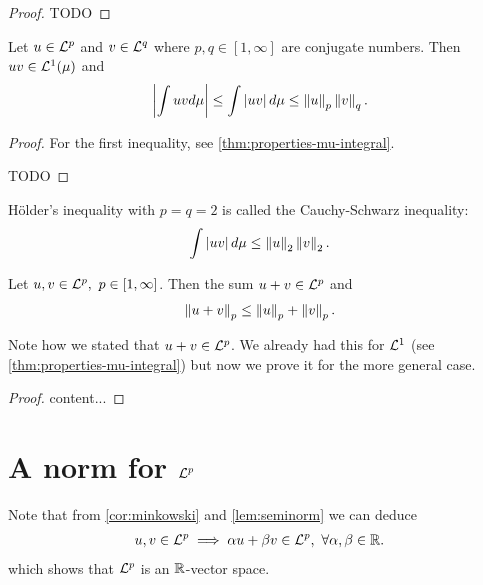 \begin{proof}
	TODO
\end{proof}

\begin{thm}
	\label{thm:holder}
	Let $u \in \mathcal{L}^p$ and $v \in \mathcal{L}^q$ where $p, q \in [1,\infty]$ are conjugate numbers. Then $uv \in \mathcal{L}^1(\mu)$ and
	\begin{align}
		\left\vert{\int uv d\mu }\right\vert \leq \int \left\vert{uv}\right\vert d\mu \leq \left\Vert{u}\right\Vert_p \left\Vert{v}\right\Vert_q.
	\end{align}
\end{thm}

\begin{proof}
	For the first inequality, see \autoref{thm:properties-mu-integral}.
	
	TODO
\end{proof}

\begin{cor}
	\label{cor:cauchy-schwarz}
	Hölder's inequality with $p = q = 2$ is called the Cauchy-Schwarz inequality:
	\begin{align}
		\int \left\vert{uv}\right\vert d\mu \leq \left\Vert{u}\right\Vert_2 \left\Vert{v}\right\Vert_2.
	\end{align}
\end{cor}

\begin{cor}
	\label{cor:minkowski}
	Let $u, v \in \mathcal{L}^p,\ p \in [1, \infty]$. Then the sum $u + v \in \mathcal{L}^p$ and
	\begin{align}
		\left\Vert{u + v}\right\Vert_p \leq \left\Vert{u}\right\Vert_p + \left\Vert{v}\right\Vert_p.
	\end{align}
\end{cor}

Note how we stated that $u + v \in \mathcal{L}^p$. We already had this for $\mathcal{L}^1$ (see \autoref{thm:properties-mu-integral}) but now we prove it for the more general case.

\begin{proof}
	content...
\end{proof}



\section{\texorpdfstring{A norm for $\mathcal{L}^p$}{A norm for Lp}}

\begin{remark}
	Note that from \autoref{cor:minkowski} and \autoref{lem:seminorm} we can deduce
	\begin{align}
		u, v \in \mathcal{L}^p \implies \alpha u  + \beta v \in \mathcal{L}^p,\ \forall \alpha, \beta \in \mathbb{R}.
	\end{align}
	which shows that $\mathcal{L}^p$ is an $\mathbb{R}$-vector space.
\end{remark}

